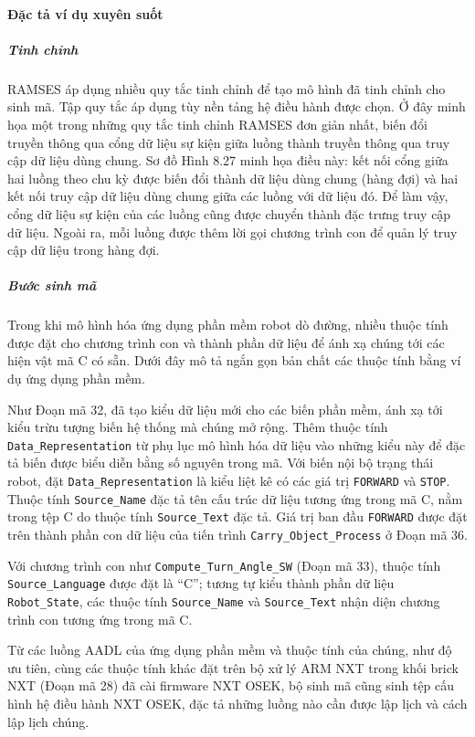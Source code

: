 \paragraph{Đặc tả ví dụ xuyên suốt}
\subparagraph{Tinh chỉnh}
RAMSES áp dụng nhiều quy tắc tinh chỉnh để tạo mô hình đã tinh chỉnh cho sinh mã. Tập quy tắc áp dụng tùy nền tảng hệ điều hành được chọn. Ở đây minh họa một trong những quy tắc tinh chỉnh RAMSES đơn giản nhất, biến đổi truyền thông qua cổng dữ liệu sự kiện giữa luồng thành truyền thông qua truy cập dữ liệu dùng chung. Sơ đồ Hình 8.27 minh họa điều này: kết nối cổng giữa hai luồng theo chu kỳ
được biến đổi thành dữ liệu dùng chung (hàng đợi) và hai kết nối truy cập dữ liệu dùng chung giữa các luồng với dữ liệu đó. Để làm vậy, cổng dữ liệu sự kiện của các luồng cũng được chuyển thành đặc trưng truy cập dữ liệu. Ngoài ra, mỗi luồng được thêm lời gọi chương trình con để quản lý truy cập dữ liệu trong hàng đợi.

\subparagraph{Bước sinh mã}
Trong khi mô hình hóa ứng dụng phần mềm robot dò đường, nhiều thuộc tính được đặt cho chương trình con và thành phần dữ liệu để ánh xạ chúng tới các hiện vật mã C có sẵn. Dưới đây mô tả ngắn gọn bản chất các thuộc tính bằng ví dụ ứng dụng phần mềm.

Như Đoạn mã 32, đã tạo kiểu dữ liệu mới cho các biến phần mềm, ánh xạ tới kiểu trừu tượng biến hệ thống mà chúng mở rộng. Thêm thuộc tính \texttt{Data\_Representation} từ phụ lục mô hình hóa dữ liệu vào những kiểu này để đặc tả biến được biểu diễn bằng số nguyên trong mã. Với biến nội bộ trạng thái robot, đặt \texttt{Data\_Representation} là kiểu liệt kê có các giá trị \texttt{FORWARD} và \texttt{STOP}. Thuộc tính \texttt{Source\_Name} đặc tả tên cấu trúc dữ liệu tương ứng trong mã C, nằm trong tệp C do thuộc tính \texttt{Source\_Text} đặc tả. Giá trị ban đầu \texttt{FORWARD} được đặt trên thành phần con dữ liệu của tiến trình \texttt{Carry\_Object\_Process} ở Đoạn mã 36.

Với chương trình con như \texttt{Compute\_Turn\_Angle\_SW} (Đoạn mã 33), thuộc tính \texttt{Source\_Language} được đặt là ``C''; tương tự kiểu thành phần dữ liệu \texttt{Robot\_State}, các thuộc tính \texttt{Source\_Name} và \texttt{Source\_Text} nhận diện chương trình con tương ứng trong mã C.

Từ các luồng AADL của ứng dụng phần mềm và thuộc tính của chúng, như độ ưu tiên, cùng các thuộc tính khác đặt trên bộ xử lý ARM NXT trong khối brick NXT (Đoạn mã 28) đã cài firmware NXT OSEK, bộ sinh mã cũng sinh tệp cấu hình hệ điều hành NXT OSEK, đặc tả những luồng nào cần được lập lịch và cách lập lịch chúng.

